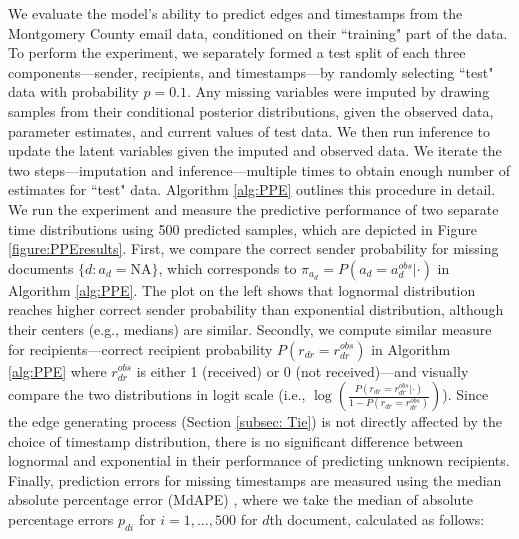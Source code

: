 \documentclass[12pt]{article}
\begin{document}
		We evaluate the model's ability to predict edges and timestamps from the Montgomery County email data, conditioned on their ``training" part of the data. To perform the experiment, we separately formed a test split of each three components---sender, recipients, and timestamps---by randomly selecting ``test" data with probability $p=0.1$. Any missing variables were imputed by drawing samples from their conditional posterior distributions, given the observed data, parameter estimates, and current values of test data. We then run inference to update the latent variables given the imputed and observed data. We iterate the two steps---imputation and inference---multiple times to obtain enough number of estimates for ``test" data. Algorithm \ref{alg:PPE} outlines this procedure in detail. We run the experiment and measure the predictive performance of two separate time distributions using 500 predicted samples, which are depicted in Figure \ref{figure:PPEresults}. First, we compare the correct sender probability for missing documents $\{d:a_d=\mbox{NA}\}$, which corresponds to $\pi_{a_{d}}=P(a_{d} = a^{obs}_{d}|\cdot)$ in Algorithm \ref{alg:PPE}. The plot on the left shows that lognormal distribution reaches higher correct sender probability than exponential distribution, although their centers (e.g., medians) are similar. Secondly, we compute similar measure for recipients---correct recipient probability $P(r_{dr} = r^{obs}_{dr})$ in Algorithm \ref{alg:PPE} where $r^{obs}_{dr}$ is either 1 (received) or 0 (not received)---and visually compare the two distributions in logit scale (i.e., $\log(\frac{P(r_{dr} = r^{obs}_{dr}|\cdot)}{1-P(r_{dr} = r^{obs}_{dr})})$). Since the edge generating process (Section \ref{subsec: Tie}) is not directly affected by the choice of timestamp distribution, there is no significant difference between lognormal and exponential in their performance of predicting unknown recipients. Finally, prediction errors for missing timestamps are measured using the median absolute percentage error (MdAPE) \citep{hyndman2006another}, where we take the median of absolute percentage errors $p_{di}$ for $i=1,\ldots,500$ for $d$th document, calculated as follows:
\end{document}
